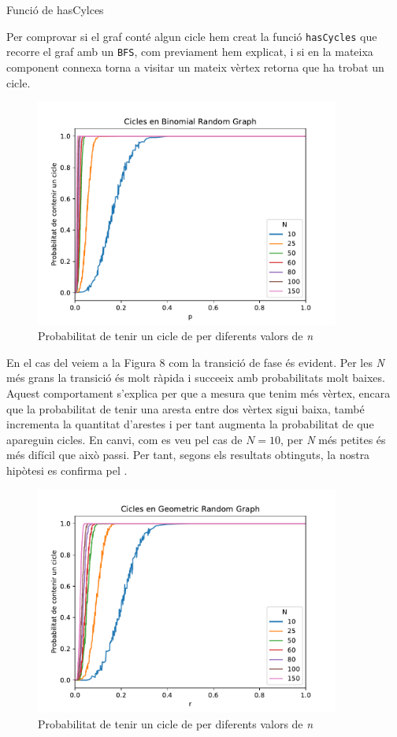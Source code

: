 \begin{listing}
\inputminted[firstline=27,lastline=57]{cpp}{src/graph.cpp}
\caption{Funció de hasCylces}
\end{listing}

Per comprovar si el graf conté algun cicle hem creat la funció \texttt{hasCycles} que recorre el graf amb un \texttt{BFS}, com previament hem explicat, i si en la mateixa component connexa torna a visitar un mateix vèrtex retorna que ha trobat un cicle.

\begin{figure}[H]
    \centering
    \includegraphics[width=10cm]{plots/BRG_cicle.pdf}
    \caption{Probabilitat de tenir un cicle de \BRG per diferents valors de \textit{n}}
    \label{fig:BRG_cicle}
\end{figure}

En el cas del \BRG veiem a la Figura 8 com la transició de fase és evident. Per les \emph{N} més grans la transició és molt ràpida i succeeix amb probabilitats molt baixes. Aquest comportament s'explica per que a mesura que tenim més vèrtex, encara que la probabilitat de tenir una aresta entre dos vèrtex sigui baixa, també incrementa la quantitat d'arestes i per tant augmenta la probabilitat de que apareguin cicles. En canvi, com es veu pel cas de $N=10$, per \emph{N} més petites és més difícil que això passi. Per tant, segons els resultats obtinguts, la nostra hipòtesi es confirma pel \BRG.

\begin{figure}[H]
    \centering
    \includegraphics[width=10cm]{plots/GRG_cicle.pdf}
    \caption{Probabilitat de tenir un cicle de \RGG per diferents valors de \textit{n}}
    \label{fig:GRG_cicle}
\end{figure}

